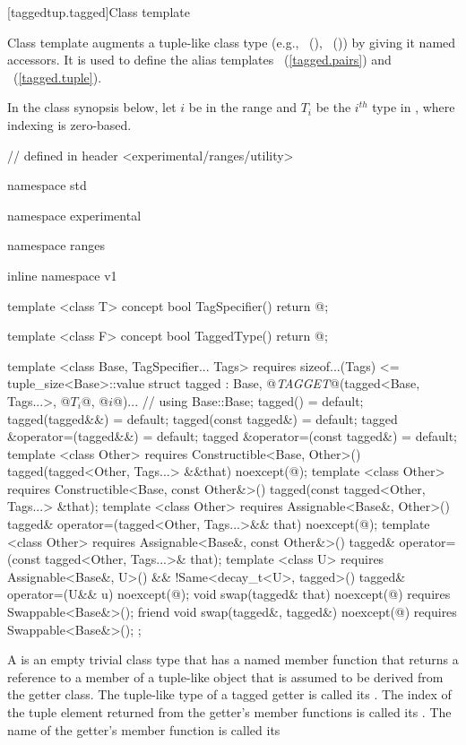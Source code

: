 [taggedtup.tagged]{Class template }

\pnum
Class template  augments a tuple-like class type (e.g., ~(),
~()) by giving it named accessors. It is used to define the alias
templates ~(\ref{tagged.pairs}) and
~(\ref{tagged.tuple}).

\pnum In the class synopsis below, let $i$ be in the range
 and $T_i$ be the $i^{th}$ type in , where indexing
is zero-based.

%
\begin{codeblock}
// defined in header <experimental/ranges/utility>

namespace std { namespace experimental { namespace ranges { inline namespace v1 {
  template <class T>
  concept bool TagSpecifier() {
    return @\impdef@;
  }

  template <class F>
  concept bool TaggedType() {
    return @\impdef@;
  }

  template <class Base, TagSpecifier... Tags>
    requires sizeof...(Tags) <= tuple_size<Base>::value
  struct tagged :
    Base, @\textit{TAGGET}@(tagged<Base, Tags...>, @$T_i$@, @$i$@)... { // \seebelow
    using Base::Base;
    tagged() = default;
    tagged(tagged&&) = default;
    tagged(const tagged&) = default;
    tagged &operator=(tagged&&) = default;
    tagged &operator=(const tagged&) = default;
    template <class Other>
      requires Constructible<Base, Other>()
    tagged(tagged<Other, Tags...> &&that) noexcept(@\seebelow@);
    template <class Other>
      requires Constructible<Base, const Other&>()
    tagged(const tagged<Other, Tags...> &that);
    template <class Other>
      requires Assignable<Base&, Other>()
    tagged& operator=(tagged<Other, Tags...>&& that) noexcept(@\seebelow@);
    template <class Other>
      requires Assignable<Base&, const Other&>()
    tagged& operator=(const tagged<Other, Tags...>& that);
    template <class U>
      requires Assignable<Base&, U>() && !Same<decay_t<U>, tagged>()
    tagged& operator=(U&& u) noexcept(@\seebelow@);
    void swap(tagged& that) noexcept(@\seebelow@)
      requires Swappable<Base&>();
    friend void swap(tagged&, tagged&) noexcept(@\seebelow@)
      requires Swappable<Base&>();
  };
}}}}
\end{codeblock}

\pnum A  is an empty trivial class type that has a named member function that
returns a reference to a member of a tuple-like object that is assumed to be derived from the getter
class. The tuple-like type of a tagged getter is called its .
The index of the tuple element returned from the getter's member functions is called its
. The name of the getter's member function is called its

